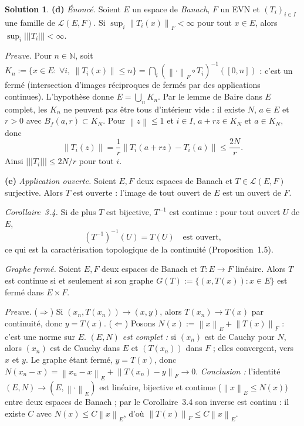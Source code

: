 \documentclass[11pt,a4paper]{article}
\newcommand{\N}{\mathbb{N}}
\newcommand{\Bf}{B_f}
\newcommand{\norm}[1]{\left\|#1\right\|}
\newcommand{\opnorm}[1]{|\!|\!|#1|\!|\!|}
\newcommand{\Lc}{\mathcal{L}}
\theoremstyle{definition}
\newtheorem*{solution}{Solution}
\begin{document}
\begin{solution}
\medskip
\noindent\textbf{(d)} \emph{Énoncé.} Soient $E$ un espace de \emph{Banach}, $F$ un EVN et $(T_i)_{i\in I}$ une famille de $\Lc(E,F)$. Si $\sup_i\norm{T_i(x)}_F<\infty$ pour tout $x\in E$, alors $\sup_i\opnorm{T_i}<\infty$.

\emph{Preuve.} Pour $n\in\N$, soit $K_n:=\{x\in E:\ \forall i,\ \norm{T_i(x)}\le n\}=\bigcap_i(\norm\cdot_F\circ T_i)^{-1}([0,n])$ : c'est un fermé (intersection d'images réciproques de fermés par des applications continues). L'hypothèse donne $E=\bigcup_nK_n$. Par le lemme de Baire dans $E$ complet, les $K_n$ ne peuvent pas être tous d'intérieur vide : il existe $N$, $a\in E$ et $r>0$ avec $\Bf(a,r)\subset K_N$. Pour $\norm z\le1$ et $i\in I$, $a+rz\in K_N$ et $a\in K_N$, donc
\[
\norm{T_i(z)}=\frac1r\norm{T_i(a+rz)-T_i(a)}\le\frac{2N}r .
\]
Ainsi $\opnorm{T_i}\le2N/r$ pour tout $i$.

\medskip
\noindent\textbf{(e)} \emph{Application ouverte.} Soient $E,F$ deux espaces de Banach et $T\in\Lc(E,F)$ surjective. Alors $T$ est ouverte : l'image de tout ouvert de $E$ est un ouvert de $F$.

\emph{Corollaire~3.4.} Si de plus $T$ est bijective, $T^{-1}$ est continue : pour tout ouvert $U$ de $E$,
\[
(T^{-1})^{-1}(U)=T(U)\quad\text{est ouvert,}
\]
ce qui est la caractérisation topologique de la continuité (Proposition~1.5).

\emph{Graphe fermé.} Soient $E,F$ deux espaces de Banach et $T:E\to F$ linéaire. Alors $T$ est continue si et seulement si son graphe $G(T):=\{(x,T(x)):x\in E\}$ est fermé dans $E\times F$.

\emph{Preuve.} ($\Rightarrow$) Si $(x_n,T(x_n))\to(x,y)$, alors $T(x_n)\to T(x)$ par continuité, donc $y=T(x)$. ($\Leftarrow$) Posons $N(x):=\norm x_E+\norm{T(x)}_F$ : c'est une norme sur $E$. \emph{$(E,N)$ est complet :} si $(x_n)$ est de Cauchy pour $N$, alors $(x_n)$ est de Cauchy dans $E$ et $(T(x_n))$ dans $F$ ; elles convergent, vers $x$ et $y$. Le graphe étant fermé, $y=T(x)$, donc $N(x_n-x)=\norm{x_n-x}_E+\norm{T(x_n)-y}_F\to0$. \emph{Conclusion :} l'identité $(E,N)\to(E,\norm\cdot_E)$ est linéaire, bijective et continue ($\norm x_E\le N(x)$) entre deux espaces de Banach ; par le Corollaire~3.4 son inverse est continu : il existe $C$ avec $N(x)\le C\norm x_E$, d'où $\norm{T(x)}_F\le C\norm x_E$.
\end{solution}
\end{document}
